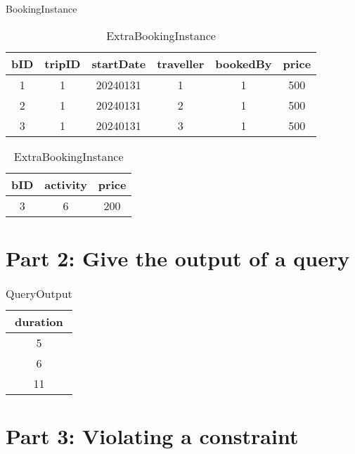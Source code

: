 \documentclass{article}
\begin{document}
\begin{table}[H]
\parbox{.35\linewidth}{
    \centering
    \caption*{BookingInstance}
    \begin{tabular}{|c|c|c|c|c|c|}
    \hline
    bID & tripID & startDate & traveller & bookedBy & price \\ [.5 ex]
    \hline\hline
    1 & 1 & 20240131 & 1 & 1 & 500 \\
    \hline
    2 & 1 & 20240131 & 2 & 1 & 500 \\
    \hline
    3 & 1 & 20240131 & 3 & 1 & 500 \\
    \hline
    \end{tabular}
}
\hfill
\parbox{.3\linewidth}{
    \centering
    \caption*{ExtraBookingInstance}
    \begin{tabular}{|c|c|c|}
    \hline
    bID & activity & price \\ [.5 ex]
    \hline\hline
    3 & 6 & 200 \\
    \hline
    \end{tabular}
}
\end{table}

\section*{Part 2: Give the output of a query}

\begin{table}[H]
    \centering
    \caption*{QueryOutput}
    \begin{tabular}{|c|}
    \hline
    duration \\ [.5 ex]
    \hline\hline
    5 \\
    \hline
    6 \\
    \hline
    11 \\
    \hline
    \end{tabular}
\end{table}

\newpage

\section*{Part 3: Violating a constraint}
\end{document}
